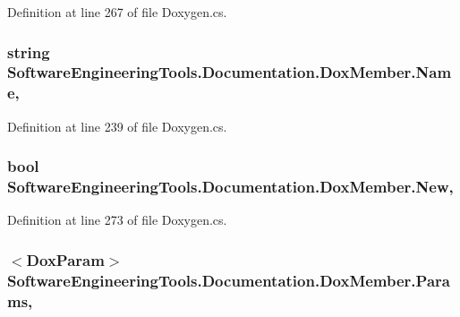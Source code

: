 Definition at line 267 of file Doxygen.\+cs.

\hypertarget{class_software_engineering_tools_1_1_documentation_1_1_dox_member_acb73cc5a890fa845f8378dbc75248887}{
\subsubsection[{Name}]{\setlength{\rightskip}{0pt plus 5cm}string Software\+Engineering\+Tools.\+Documentation.\+Dox\+Member.\+Name\hspace{0.3cm}{\ttfamily [get]}, {\ttfamily [set]}}}\label{class_software_engineering_tools_1_1_documentation_1_1_dox_member_acb73cc5a890fa845f8378dbc75248887}


Definition at line 239 of file Doxygen.\+cs.

\hypertarget{class_software_engineering_tools_1_1_documentation_1_1_dox_member_a1abb4ca84b97c69c8a03e3d4c1944b10}{
\subsubsection[{New}]{\setlength{\rightskip}{0pt plus 5cm}bool Software\+Engineering\+Tools.\+Documentation.\+Dox\+Member.\+New\hspace{0.3cm}{\ttfamily [get]}, {\ttfamily [set]}}}\label{class_software_engineering_tools_1_1_documentation_1_1_dox_member_a1abb4ca84b97c69c8a03e3d4c1944b10}


Definition at line 273 of file Doxygen.\+cs.

\hypertarget{class_software_engineering_tools_1_1_documentation_1_1_dox_member_acfbe71d778fd8cfac409ba43453f0ee4}{
\subsubsection[{Params}]{$<${\bf Dox\+Param}$>$ Software\+Engineering\+Tools.\+Documentation.\+Dox\+Member.\+Params\hspace{0.3cm}{\ttfamily [get]}, {\ttfamily [set]}}}\label{class_software_engineering_tools_1_1_documentation_1_1_dox_member_acfbe71d778fd8cfac409ba43453f0ee4}


